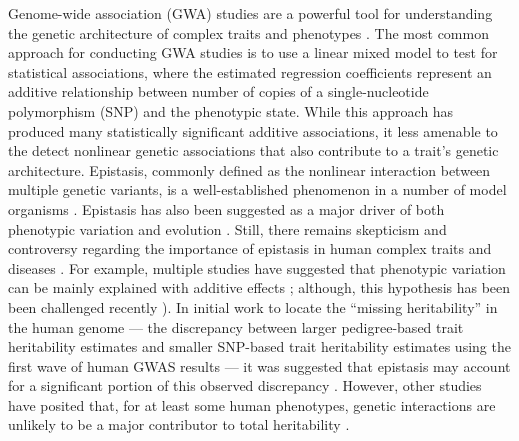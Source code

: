 \documentclass[10pt,a4paper]{article}
\begin{document}
Genome-wide association (GWA) studies are a powerful tool for understanding the genetic architecture of complex traits and phenotypes \cite{Buniello2019}. The most common approach for conducting GWA studies is to use a linear mixed model to test for statistical associations, where the estimated regression coefficients represent an additive relationship between number of copies of a single-nucleotide polymorphism (SNP) and the phenotypic state. While this approach has produced many statistically significant additive associations, it less amenable to the detect nonlinear genetic associations that also contribute to a trait's genetic architecture. Epistasis, commonly defined as the nonlinear interaction between multiple genetic variants, is a well-established phenomenon in a number of model organisms \cite{Lehner2006,Rowe2008,Shao2008,Flint2009,Costanzo2010,He2010,Jarvis2011,Pettersson2011,Bloom2013,Monnahan2015}. Epistasis has also been suggested as a major driver of both phenotypic variation and evolution \cite{Carlborg2004,Carlborg2006,Martin2007,Phillips2008,Moore2009,Zuk2012,Jones2014,Mackay2014}. Still, there remains skepticism and controversy regarding the importance of epistasis in human complex traits and diseases \cite{Hill2008,Crow2010,Yang2010,Aschard2012,Powell2013,Maki-Tanila2014,Wood2014,Yang2015}. For example, multiple studies have suggested that phenotypic variation can be mainly explained with additive effects \cite{Hill2008,Crow2010,Maki-Tanila2014}; although, this hypothesis has been been challenged recently \cite{Huang2016}). In initial work to locate the  ``missing heritability'' in the human genome --- the discrepancy between larger pedigree-based trait heritability estimates and smaller SNP-based trait heritability estimates using the first wave of human GWAS results \cite{Maher2008,Manolio2009,Eichler2010} --- it was suggested that epistasis may account for a significant portion of this observed discrepancy \cite{Slatkin2009,Zuk2012,Hemani2013}. However, other studies have posited that, for at least some human phenotypes, genetic interactions are unlikely to be a major contributor to total heritability \cite{Yang2015}.

\end{document}
